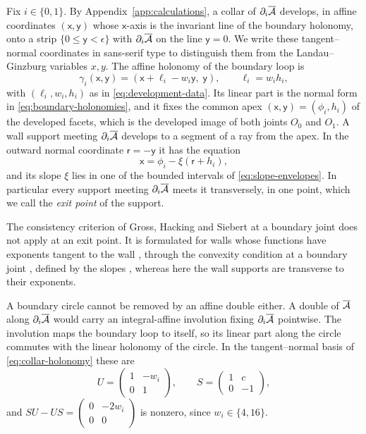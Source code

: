 Fix $i\in\{0,1\}$.  By Appendix~\ref{app:calculations}, a collar of
$\partial_i\overline{\mathcal A}$ develops, in affine coordinates
$(\mathsf x,\mathsf y)$ whose $\mathsf x$-axis is the invariant line of the
boundary holonomy, onto a strip $\{0\leq\mathsf y<\epsilon\}$ with
$\partial_i\overline{\mathcal A}$ on the line $\mathsf y=0$.  We write these
tangent--normal coordinates in sans-serif type to distinguish them from the
Landau--Ginzburg variables $x,y$.  The affine holonomy of the boundary loop
is
\begin{equation}\label{eq:collar-holonomy}
 \gamma_i(\mathsf x,\mathsf y)=(\mathsf x+\ell_i-w_i\mathsf y,\;\mathsf y),
 \qquad \ell_i=w_ih_i,
\end{equation}
with $(\ell_i,w_i,h_i)$ as in \eqref{eq:development-data}.  Its linear part
is the normal form in \eqref{eq:boundary-holonomies}, and it fixes the
common apex $(\mathsf x,\mathsf y)=(\phi_i,h_i)$ of the developed facets,
which is the developed image of both joints $O_0$ and $O_1$.  A wall support
meeting $\partial_i\overline{\mathcal A}$ develops to a segment of a ray from the
apex.  In the outward normal coordinate $\mathsf r=-\mathsf y$ it has the
equation
\begin{equation}\label{eq:exit-line}
 \mathsf x=\phi_i-\xi(\mathsf r+h_i),
\end{equation}
and its slope $\xi$ lies in one of the bounded intervals of
\eqref{eq:slope-envelopes}.  In particular every support meeting
$\partial_i\overline{\mathcal A}$ meets it transversely, in one point, which we
call the \emph{exit point} of the support.

The consistency criterion of Gross, Hacking and Siebert at a boundary joint
\cite[Prop.~3.13]{grossetal2016theta} does not apply at an exit point.  It
is formulated for walls whose functions have exponents tangent to the wall
\cite[Def.~2.11]{grossetal2016theta}, through the convexity condition at a
boundary joint \cite[Def.~3.12]{grossetal2016theta}, defined by the slopes
\cite[(3.7)]{grossetal2016theta}, whereas here the wall
supports are transverse to their exponents.

A boundary circle cannot be removed by an affine double either.  A double of
$\overline{\mathcal A}$ along $\partial_i\overline{\mathcal A}$ would carry an
integral-affine involution fixing $\partial_i\overline{\mathcal A}$ pointwise.  The
involution maps the boundary loop to itself, so its linear part along the
circle commutes with the linear holonomy of the circle.  In the
tangent--normal basis of \eqref{eq:collar-holonomy} these are
\[
 U=\begin{pmatrix}1&-w_i\\0&1\end{pmatrix},
 \qquad S=\begin{pmatrix}1&c\\0&-1\end{pmatrix},
\]
and $SU-US=\begin{pmatrix}0&-2w_i\\0&0\end{pmatrix}$ is nonzero, since
$w_i\in\{4,16\}$.

